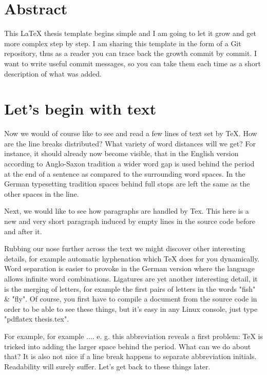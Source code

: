 \documentclass[11pt,a4paper,twoside,titlepage]{book}
\begin{document}
\frontmatter
\chapter{Abstract}%
This LaTeX thesis template begins simple and I am going to let it grow and get more complex step by step. I am sharing this template in the form of a Git repository, thus as a reader you can trace back the growth commit by commit. I want to write useful commit messages, so you can take them each time as a short description of what was added.

\mainmatter
\chapter{Let's begin with text}%
Now we would of course like to see and read a few lines of text set by TeX. How are the line breaks distributed? What variety of word distances will we get? For instance, it should already now become visible, that in the English version according to Anglo-Saxon tradition a wider word gap is used behind the period at the end of a sentence as compared to the surrounding word spaces. In the German typesetting tradition spaces behind full stops are left the same as the other spaces in the line.

Next, we would like to see how paragraphs are handled by Tex. This here is a new and very short paragraph induced by empty lines in the source code before and after it.

Rubbing our nose further across the text we might discover other interesting details, for example automatic hyphenation which TeX does for you dynamically. Word separation is easier to provoke in the German version where the language allows infinite word combinations. Ligatures are yet another interesting detail, it is the merging of letters, for example the first pairs of letters in the words "fish" \& "fly". Of course, you first have to compile a document from the source code in order to be able to see these things, but it's easy in any Linux console, just type "pdflatex thesis.tex".

For example, for example .... e. g. this abbreviation reveals a first problem: TeX is tricked into adding the larger space behind the period. What can we do about that? It is also not nice if a line break happens to separate abbreviation initials. Readability will surely suffer. Let's get back to these things later.
\end{document}
